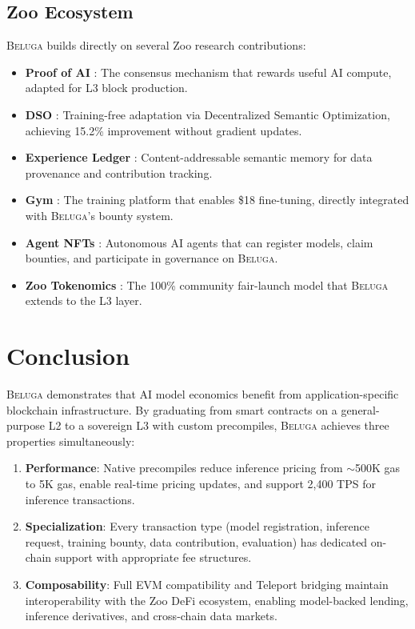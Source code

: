 \documentclass[11pt,letterpaper]{article}
\newcommand{\Beluga}{\textsc{Beluga}}
\begin{document}
\subsection{Zoo Ecosystem}

\Beluga{} builds directly on several Zoo research contributions:

\begin{itemize}[nosep]
    \item \textbf{Proof of AI} \cite{zoo-poai}: The consensus mechanism that rewards useful AI compute, adapted for L3 block production.
    \item \textbf{DSO} \cite{zoo-dso}: Training-free adaptation via Decentralized Semantic Optimization, achieving 15.2\% improvement without gradient updates.
    \item \textbf{Experience Ledger} \cite{zoo-experience-ledger}: Content-addressable semantic memory for data provenance and contribution tracking.
    \item \textbf{Gym} \cite{zoo-gym}: The training platform that enables \$18 fine-tuning, directly integrated with \Beluga{}'s bounty system.
    \item \textbf{Agent NFTs} \cite{zoo-agent-nft}: Autonomous AI agents that can register models, claim bounties, and participate in governance on \Beluga{}.
    \item \textbf{Zoo Tokenomics} \cite{zoo-tokenomics}: The 100\% community fair-launch model that \Beluga{} extends to the L3 layer.
\end{itemize}

\section{Conclusion}\label{sec:conclusion}

\Beluga{} demonstrates that AI model economics benefit from application-specific blockchain infrastructure. By graduating from smart contracts on a general-purpose L2 to a sovereign L3 with custom precompiles, \Beluga{} achieves three properties simultaneously:

\begin{enumerate}
    \item \textbf{Performance}: Native precompiles reduce inference pricing from $\sim$500K gas to 5K gas, enable real-time pricing updates, and support 2,400 TPS for inference transactions.
    \item \textbf{Specialization}: Every transaction type (model registration, inference request, training bounty, data contribution, evaluation) has dedicated on-chain support with appropriate fee structures.
    \item \textbf{Composability}: Full EVM compatibility and Teleport bridging maintain interoperability with the Zoo DeFi ecosystem, enabling model-backed lending, inference derivatives, and cross-chain data markets.
\end{enumerate}
\end{document}
